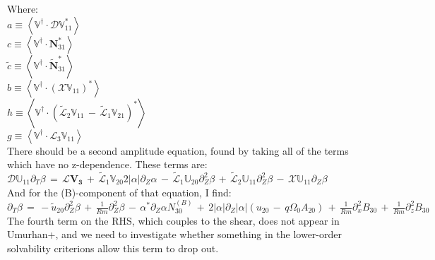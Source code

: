 \documentclass[letterpaper,12pt]{article}
\newcommand\reym{\mathrel{Rm}}
\begin{document}
Where: \\

$a \equiv \left< \mathbb{V}^\dagger \cdot \mathcal{D}\mathbb{V}^*_{11}\right>$ \\

$c \equiv \left< \mathbb{V}^\dagger \cdot \mathbf{N}^*_{31}\right>$ \\

$\widetilde{c} \equiv \left< \mathbb{V}^\dagger \cdot \widetilde{\mathbf{N}}^*_{31}\right>$ \\

$b \equiv \left< \mathbb{V}^\dagger \cdot \left(\mathcal{X}\mathbb{V}_{11}\right)^* \right>$ \\

$h \equiv \left< \mathbb{V}^\dagger \cdot \left(\widetilde{\mathcal{L}}_2\mathbb{V}_{11} \, - \, \widetilde{\mathcal{L}}_1\mathbb{V}_{21} \right)^* \right>$ \\

$g \equiv \left< \mathbb{V}^\dagger \cdot \mathcal{L}_{3} \mathbb{V}_{11} \right>$ \\

There should be a second amplitude equation, found by taking all of the terms which have no z-dependence. These terms are: \\

$\mathcal{D}\mathbb{U}_{11} \partial_T \beta \, = \, \mathcal{L}\mathbf{V_3} \, + \, \widetilde{\mathcal{L}}_1 \mathbb{V}_{20} 2 \left|\alpha\right| \partial_Z \alpha \, - \, \widetilde{\mathcal{L}}_1 \mathbb{U}_{20} \partial_Z^2 \beta \, + \, \widetilde{\mathcal{L}}_2 \mathbb{U}_{11} \partial_Z^2 \beta \, - \, \mathcal{X} \mathbb{U}_{11} \partial_Z \beta \, $\\

And for the (B)-component of that equation, I find: \\

$\partial_T \beta \, = \, -\widetilde{u}_{20} \partial_Z^2 \beta \, + \, \frac{1}{\reym} \partial_Z^2 \beta \, - \, \alpha^* \partial_Z \alpha N_{30}^{(B)} \, + \, 2 \left|\alpha\right| \partial_Z \left| \alpha \right| \left(u_{20} \, - \, q\Omega_0A_{20}\right) \, + \, \frac{1}{\reym} \partial_x^2 B_{30} \, + \, \frac{1}{\reym} \partial_z^2 B_{30}$ \\

The fourth term on the RHS, which couples to the shear, does not appear in Umurhan+, and we need to investigate whether something in the lower-order solvability criterions allow this term to drop out. \\
\end{document}
